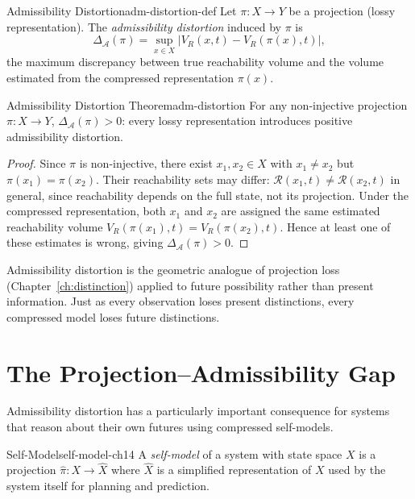 \documentclass[12pt,twoside,openright]{book}
\newcommand{\reach}{\mathcal{R}}
\newcommand{\adm}{\mathcal{A}}
\begin{document}
\begin{definition}{Admissibility Distortion}{adm-distortion-def}
  Let $\pi:X\to Y$ be a projection (lossy representation).
  The \emph{admissibility distortion} induced by $\pi$ is
  \[
    \Delta_\adm(\pi)
    = \sup_{x\in X} |V_R(x,t) - V_R(\pi(x),t)|,
  \]
  the maximum discrepancy between true reachability volume
  and the volume estimated from the compressed
  representation $\pi(x)$.
\end{definition}

\begin{theorem}{Admissibility Distortion Theorem}{adm-distortion}
  For any non-injective projection $\pi:X\to Y$,
  $\Delta_\adm(\pi) > 0$: every lossy representation
  introduces positive admissibility distortion.
\end{theorem}

\begin{proof}
  Since $\pi$ is non-injective, there exist
  $x_1,x_2\in X$ with $x_1\ne x_2$ but
  $\pi(x_1)=\pi(x_2)$. Their reachability sets may differ:
  $\reach(x_1,t)\ne\reach(x_2,t)$ in general, since
  reachability depends on the full state, not its
  projection. Under the compressed representation, both
  $x_1$ and $x_2$ are assigned the same estimated
  reachability volume $V_R(\pi(x_1),t)=V_R(\pi(x_2),t)$.
  Hence at least one of these estimates is wrong, giving
  $\Delta_\adm(\pi)>0$.
\end{proof}

Admissibility distortion is the geometric analogue of
projection loss (Chapter~\ref{ch:distinction}) applied to
future possibility rather than present information. Just
as every observation loses present distinctions, every
compressed model loses future distinctions.

\section{The Projection--Admissibility Gap}
\label{sec:ch14-gap}

Admissibility distortion has a particularly important
consequence for systems that reason about their own futures
using compressed self-models.

\begin{definition}{Self-Model}{self-model-ch14}
  A \emph{self-model} of a system with state space $X$ is a
  projection $\hat\pi:X\to\hat{X}$ where $\hat{X}$ is a
  simplified representation of $X$ used by the system
  itself for planning and prediction.
\end{definition}
\end{document}
